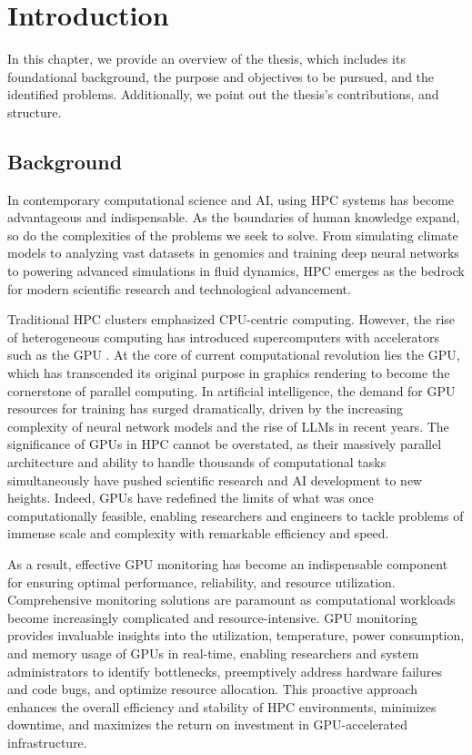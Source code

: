 \chapter{Introduction}
\label{chap:introduction}
In this chapter, we provide an overview of the thesis, which includes its foundational background, the purpose and objectives to be pursued, and the identified problems. Additionally, we point out the thesis's contributions, and structure.

\section{Background}
In contemporary computational science and AI, using HPC systems has become advantageous and indispensable. As the boundaries of human knowledge expand, so do the complexities of the problems we seek to solve. From simulating climate models to analyzing vast datasets in genomics and training deep neural networks to powering advanced simulations in fluid dynamics, HPC emerges as the bedrock for modern scientific research and technological advancement.

Traditional HPC clusters emphasized CPU-centric computing. However, the rise of heterogeneous computing has introduced supercomputers with accelerators such as the GPU \cite{5289128}. At the core of current computational revolution lies the GPU, which has transcended its original purpose in graphics rendering to become the cornerstone of parallel computing. In artificial intelligence, the demand for GPU resources for training has surged dramatically, driven by the increasing complexity of neural network models and the rise of LLMs in recent years. The significance of GPUs in HPC cannot be overstated, as their massively parallel architecture and ability to handle thousands of computational tasks simultaneously have pushed scientific research and AI development to new heights. Indeed, GPUs have redefined the limits of what was once computationally feasible, enabling researchers and engineers to tackle problems of immense scale and complexity with remarkable efficiency and speed.

As a result, effective GPU monitoring has become an indispensable component for ensuring optimal performance, reliability, and resource utilization. Comprehensive monitoring solutions are paramount as computational workloads become increasingly complicated and resource-intensive. GPU monitoring provides invaluable insights into the utilization, temperature, power consumption, and memory usage of GPUs in real-time, enabling researchers and system administrators to identify bottlenecks, preemptively address hardware failures and code bugs, and optimize resource allocation. This proactive approach enhances the overall efficiency and stability of HPC environments, minimizes downtime, and maximizes the return on investment in GPU-accelerated infrastructure.

